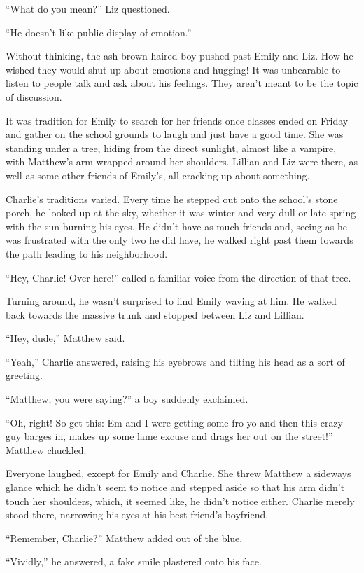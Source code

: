 “What do you mean?” Liz questioned.

“He doesn't like public display of emotion.”

Without thinking, the ash brown haired boy pushed past Emily and Liz. How he wished they would shut up about emotions and hugging! It was unbearable to listen to people talk and ask about his feelings. They aren't meant to be the topic of discussion.

\bigskip

It was tradition for Emily to search for her friends once classes ended on Friday and gather on the school grounds to laugh and just have a good time. She was standing under a tree, hiding from the direct sunlight, almost like a vampire, with Matthew's arm wrapped around her shoulders. Lillian and Liz were there, as well as some other friends of Emily's, all cracking up about something.

Charlie's traditions varied. Every time he stepped out onto the school's stone porch, he looked up at the sky, whether it was winter and very dull or late spring with the sun burning his eyes. He didn't have as much friends and, seeing as he was frustrated with the only two he did have, he walked right past them towards the path leading to his neighborhood.

“Hey, Charlie! Over here!” called a familiar voice from the direction of that tree.

Turning around, he wasn't surprised to find Emily waving at him. He walked back towards the massive trunk and stopped between Liz and Lillian.

“Hey, dude,” Matthew said.

“Yeah,” Charlie answered, raising his eyebrows and tilting his head as a sort of greeting.

“Matthew, you were saying?” a boy suddenly exclaimed.

“Oh, right! So get this: Em and I were getting some fro-yo and then this crazy guy barges in, makes up some lame excuse and drags her out on the street!” Matthew chuckled.

Everyone laughed, except for Emily and Charlie. She threw Matthew a sideways glance which he didn't seem to notice and stepped aside so that his arm didn't touch her shoulders, which, it seemed like, he didn't notice either. Charlie merely stood there, narrowing his eyes at his best friend's boyfriend.

“Remember, Charlie?” Matthew added out of the blue.

“Vividly,” he answered, a fake smile plastered onto his face.

